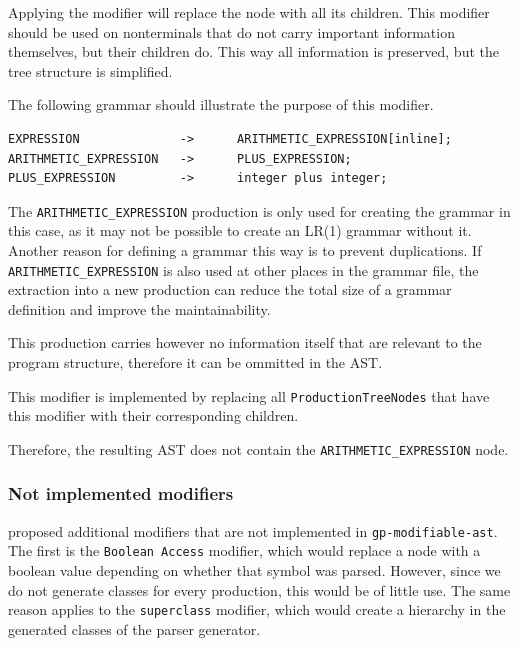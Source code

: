 Applying the modifier will replace the node with all its children. 
This modifier should be used on nonterminals that do not carry important information themselves, but their children do. 
This way all information is preserved, but the tree structure is simplified.

The following grammar should illustrate the purpose of this modifier.

\begin{lstlisting}[caption=inline modifier example grammar]
EXPRESSION              ->      ARITHMETIC_EXPRESSION[inline];
ARITHMETIC_EXPRESSION   ->      PLUS_EXPRESSION;
PLUS_EXPRESSION         ->      integer plus integer;
\end{lstlisting}

The \lstinline{ARITHMETIC_EXPRESSION} production is only used for creating the grammar in this case, as it may not be possible to create an LR(1) grammar without it.
Another reason for defining a grammar this way is to prevent duplications. If \lstinline{ARITHMETIC_EXPRESSION} is also used at other places in the grammar file,
the extraction into a new production can reduce the total size of a grammar definition and improve the maintainability.

This production carries however no information itself that are relevant to the program structure, therefore it can be ommitted in the AST.

This modifier is implemented by replacing all \verb|ProductionTreeNodes| that have this modifier with their corresponding children.

Therefore, the resulting AST does not contain the \lstinline{ARITHMETIC_EXPRESSION} node.

\subsubsection{Not implemented modifiers}

\cite{GeneratingRewritableAST} proposed additional modifiers that are not implemented in \verb|gp-modifiable-ast|.
The first is the \verb|Boolean Access| modifier, which would replace a node with a boolean value depending on whether that symbol was parsed. 
However, since we do not generate classes for every production, this would be of little use.
The same reason applies to the \verb|superclass| modifier, which would create a hierarchy in the generated classes of the parser generator.
